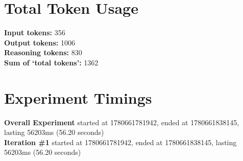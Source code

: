 \documentclass{article}
\begin{document}
\section*{Total Token Usage}
\textbf{Input tokens: }356
\\\textbf{Output tokens: }1006
\\\textbf{Reasoning tokens: }830
\\\textbf{Sum of `total tokens': }1362
\section*{Experiment Timings}
\textbf{Overall Experiment} started at 1780661781942, ended at 1780661838145, lasting 56203ms (56.20 seconds)
\\\textbf{Iteration \#1} started at 1780661781942, ended at 1780661838145, lasting 56203ms (56.20 seconds)
\end{document}
